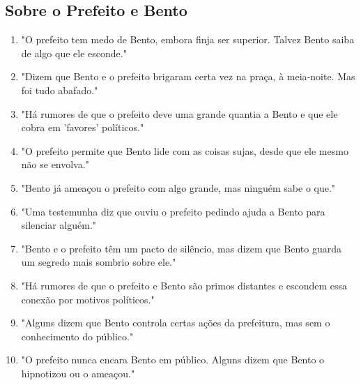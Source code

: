 \subsection*{Sobre o Prefeito e Bento}
\begin{enumerate}
    \item "O prefeito tem medo de Bento, embora finja ser superior. Talvez Bento saiba de algo que ele esconde."
    \item "Dizem que Bento e o prefeito brigaram certa vez na praça, à meia-noite. Mas foi tudo abafado."
    \item "Há rumores de que o prefeito deve uma grande quantia a Bento e que ele cobra em 'favores' políticos."
    \item "O prefeito permite que Bento lide com as coisas sujas, desde que ele mesmo não se envolva."
    \item "Bento já ameaçou o prefeito com algo grande, mas ninguém sabe o que."
    \item "Uma testemunha diz que ouviu o prefeito pedindo ajuda a Bento para silenciar alguém."
    \item "Bento e o prefeito têm um pacto de silêncio, mas dizem que Bento guarda um segredo mais sombrio sobre ele."
    \item "Há rumores de que o prefeito e Bento são primos distantes e escondem essa conexão por motivos políticos."
    \item "Alguns dizem que Bento controla certas ações da prefeitura, mas sem o conhecimento do público."
    \item "O prefeito nunca encara Bento em público. Alguns dizem que Bento o hipnotizou ou o ameaçou."
\end{enumerate}

